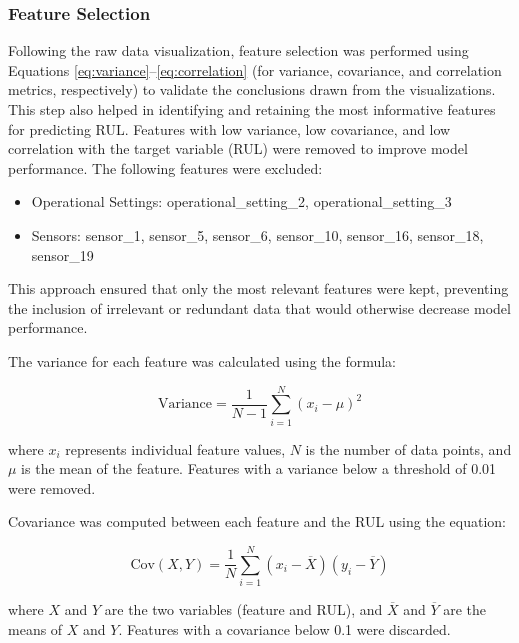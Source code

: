 \documentclass[conference]{IEEEtran}
\begin{document}
\subsubsection{Feature Selection}
Following the raw data visualization, feature selection was performed using Equations \eqref{eq:variance}--\eqref{eq:correlation} (for variance, covariance, and correlation metrics, respectively) to validate the conclusions drawn from the visualizations. This step also helped in identifying and retaining the most informative features for predicting RUL. Features with low variance, low covariance, and low correlation with the target variable (RUL) were removed to improve model performance. The following features were excluded:

\begin{itemize}
    \item Operational Settings: operational\_setting\_2, operational\_setting\_3
    \item Sensors: sensor\_1, sensor\_5, sensor\_6, sensor\_10, sensor\_16, sensor\_18, sensor\_19
\end{itemize}

This approach ensured that only the most relevant features were kept, preventing the inclusion of irrelevant or redundant data that would otherwise decrease model performance.

The variance for each feature was calculated using the formula:

\begin{equation}
\text{Variance} = \frac{1}{N - 1} \sum_{i=1}^{N} \left( x_i - \mu \right)^2
\label{eq:variance}
\end{equation}

where $x_i$ represents individual feature values, $N$ is the number of data points, and $\mu$ is the mean of the feature. Features with a variance below a threshold of 0.01 were removed.

Covariance was computed between each feature and the RUL using the equation:

\begin{equation}
\text{Cov}(X,Y) = \frac{1}{N} \sum_{i=1}^{N} \left( x_i - \overline{X} \right) \left( y_i - \overline{Y} \right)
\label{eq:covariance}
\end{equation}

where $X$ and $Y$ are the two variables (feature and RUL), and $\overline{X}$ and $\overline{Y}$ are the means of $X$ and $Y$. Features with a covariance below 0.1 were discarded.
\end{document}
